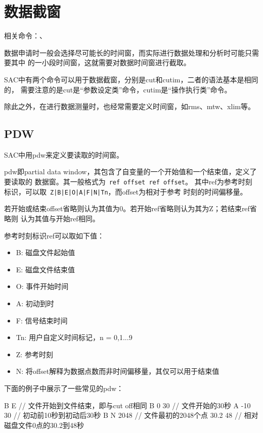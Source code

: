 \section{数据截窗}

相关命令：、

数据申请时一般会选择尽可能长的时间窗，而实际进行数据处理和分析时可能只需要其中
的一小段时间窗，这就需要对数据时间窗进行截取。

SAC中有两个命令可以用于数据截窗，分别是cut和cutim，二者的语法基本是相同的，
需要注意的是cut是``参数设定类''命令，cutim是``操作执行类''命令。

除此之外，在进行数据测量时，也经常需要定义时间窗，如rms、mtw、xlim等。

\subsection{PDW}
\label{subsec:pdw}
SAC中用pdw来定义要读取的时间窗。

pdw即partial data window，其包含了自变量的一个开始值和一个结束值，定义了要读取的
数据窗。其一般格式为~\verb+ref offset ref offset+。
其中ref为参考时刻标识，可以取~\verb+Z|B|E|O|A|F|N|Tn+，而offset为相对于参考
时刻的时间偏移量。

若开始或结束offset省略则认为其值为0。若开始ref省略则认为其为Z；若结束ref省略则
认为其值与开始ref相同。

参考时刻标识ref可以取如下值：
\begin{itemize}
\item B: 磁盘文件起始值
\item E: 磁盘文件结束值
\item O: 事件开始时间
\item A: 初动到时
\item F: 信号结束时间
\item Tn: 用户自定义时间标记，n = 0,1...9
\item Z: 参考时刻
\item N: 将offset解释为数据点数而非时间偏移量，其仅可以用于结束值
\end{itemize}

下面的例子中展示了一些常见的pdw：
\begin{SACCode}
 B E        // 文件开始到文件结束，即与cut off相同
 B 0 30     // 文件开始的30秒
 A -10 30   // 初动前10秒到初动后30秒
 B N 2048   // 文件最初的2048个点
 30.2 48    // 相对磁盘文件0点的30.2到48秒
\end{SACCode}
